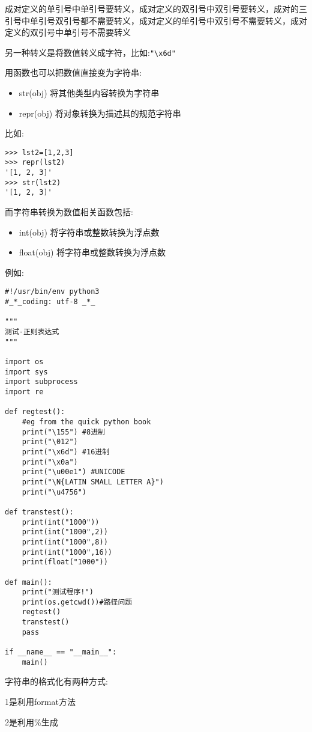 \documentclass[twoside,11pt]{book}
\begin{document}
成对定义的单引号中单引号要转义，成对定义的双引号中双引号要转义，成对的三引号中单引号双引号都不需要转义，成对定义的单引号中双引号不需要转义，成对定义的双引号中单引号不需要转义

另一种转义是将数值转义成字符，比如:\verb|"\x6d"|

用函数也可以把数值直接变为字符串:
\begin{itemize}
  \item str(obj) 将其他类型内容转换为字符串
  \item repr(obj) 将对象转换为描述其的规范字符串
\end{itemize}

比如:
\begin{lstlisting}
>>> lst2=[1,2,3]
>>> repr(lst2)
'[1, 2, 3]'
>>> str(lst2)
'[1, 2, 3]'
\end{lstlisting}

而字符串转换为数值相关函数包括:
\begin{itemize}
  \item int(obj) 将字符串或整数转换为浮点数
  \item float(obj) 将字符串或整数转换为浮点数
\end{itemize}

例如:
\begin{lstlisting}
#!/usr/bin/env python3
#_*_coding: utf-8 _*_

"""
测试-正则表达式
"""

import os
import sys
import subprocess
import re

def regtest():
    #eg from the quick python book
    print("\155") #8进制
    print("\012")
    print("\x6d") #16进制
    print("\x0a")
    print("\u00e1") #UNICODE
    print("\N{LATIN SMALL LETTER A}")
    print("\u4756")

def transtest():
    print(int("1000"))
    print(int("1000",2))
    print(int("1000",8))
    print(int("1000",16))
    print(float("1000"))

def main():
    print("测试程序!")
    print(os.getcwd())#路径问题
    regtest()
    transtest()
    pass

if __name__ == "__main__":
    main()
\end{lstlisting}

字符串的格式化有两种方式:

1是利用format方法

2是利用\%生成
\end{document}
